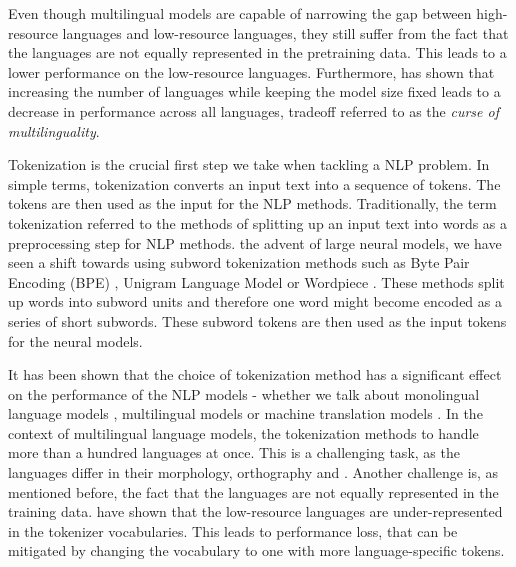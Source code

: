 Even though multilingual models are capable of narrowing the gap between high-resource languages and low-resource languages, they still suffer from the fact that the languages are not equally represented in the pretraining data. This leads to a lower performance on the low-resource languages. \cite{conneau_unsupervised_2020} Furthermore,  has shown that increasing the number of languages while keeping the model size fixed leads to a decrease in performance across all languages, tradeoff referred to as the \textit{curse of multilinguality}. \cite{conneau_unsupervised_2020} 

Tokenization is the crucial first step we take when tackling a NLP problem. In simple terms, tokenization converts an input text into a sequence of tokens. The tokens are then used as the input for the NLP methods. Traditionally, the term tokenization referred to the methods of splitting up an input text into words as a preprocessing step for NLP methods.  the advent of large neural models, we have seen a shift towards using subword tokenization methods such as Byte Pair Encoding (BPE) \cite{sennrich_neural_2016}, Unigram Language Model \cite{kudo_sentencepiece_2018} or Wordpiece \cite{devlin_bert_2019}. These methods split up words into subword units and therefore one word might become encoded as a series of short subwords. These subword tokens are then used as the input tokens for the neural models.  

It has been shown that the choice of tokenization method has a significant effect on the performance of the NLP models - whether we talk about monolingual language models \cite{bostrom_byte_2020}, multilingual models \cite{rust_how_2021} or machine translation models \cite{kudo_sentencepiece_2018,gowda_finding_2020}. In the context of multilingual language models, the tokenization methods  to handle more than a hundred languages at once. This is a challenging task, as the languages differ in their morphology, orthography and . Another challenge is, as mentioned before, the fact that the languages are not equally represented in the training data.  have shown that the low-resource languages are under-represented in the tokenizer vocabularies. This leads to performance loss, that can be mitigated by changing the vocabulary to one with more language-specific tokens. \cite{rust_how_2021}

